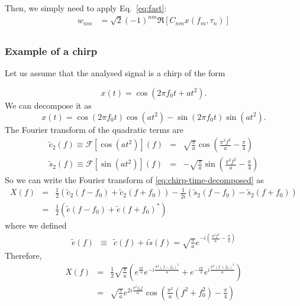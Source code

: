\documentclass{article}
\begin{document}
Then, we simply need to apply Eq.~\eqref{eq:fast}:
\begin{align}
\label{eq:fast-2}
    w_{nm} & =\sqrt{2}(-1)^{nm}\Re\left[C_{nm} x(f_m, \tau_n)\right] \nonumber \\
\end{align}

\subsubsection{Example of a chirp}
Let us assume that the analysed signal is a chirp of the form 

\begin{equation}
\label{eq:chirp-time}
    x(t) = \cos\left( 2 \pi f_0 t + a t^{2} \right).
\end{equation}
We can decompose it as 
\begin{equation}
\label{eq:chirp-time-decomposed}
    x(t) = \cos\left( 2 \pi f_0 t \right) \cos\left(a t^{2} \right) - \sin\left( 2 \pi f_0 t \right) \sin\left(a t^{2} \right).
\end{equation}
The Fourier transform of the quadratic terms are 
\begin{eqnarray}
   \tilde{c}_{2}(f) \equiv \mathcal{F}\left[\cos\left(a t^{2} \right)\right](f) & =&  \sqrt{\frac{\pi}{a}} \cos\left(\frac{\pi^2 f^2}{a} - \frac{\pi}{4} \right) \nonumber \\
   \tilde{s}_{2}(f) \equiv \mathcal{F}\left[\sin\left(a t^{2} \right)\right](f) & =&  - \sqrt{\frac{\pi}{a}} \sin\left(\frac{\pi^2 f^2}{a} - \frac{\pi}{4} \right) 
\end{eqnarray}
So we can write the Fourier transform of \eqref{eq:chirp-time-decomposed} as
\begin{eqnarray}
    X(f) & = & \frac{1}{2}\left(\tilde{c}_{2}(f-f_0) + \tilde{c}_{2}(f+f_0)\right) - \frac{1}{2i}\left(\tilde{s}_{2}(f-f_0) - \tilde{s}_{2}(f+f_0)\right) \nonumber \\
    & = & \frac{1}{2}\left(\tilde{e}(f-f_0) + \tilde{e}(f+f_0)^{\ast}\right)
\end{eqnarray}
where we defined
\begin{eqnarray}
    \tilde{e}(f) & \equiv & \tilde{c}(f) + i \tilde{s}(f) = \sqrt{\frac{\pi}{a}} e^{-i \left(\frac{\pi^2 f^2}{a} - \frac{\pi}{4} \right)}
\end{eqnarray}
Therefore,
\begin{eqnarray*}
   X(f) &=& \frac{1}{2} \sqrt{\frac{\pi}{a}}  \left(e^{\frac{i\pi}{4}}  e^{-i\frac{\pi^2 (f-f_0)^2}{a}} + e^{-\frac{i\pi}{4}}  e^{i\frac{\pi^2 (f+f_0)^2}{a}} \right) \\
  & = &  \sqrt{\frac{\pi}{a}}  e^{2 i \frac{\pi^2 f_0 f }{a}} \cos\left(\frac{\pi^2}{a} (f^2 + f_0^2) - \frac{\pi}{4}\right) 
\end{eqnarray*}
\end{document}
